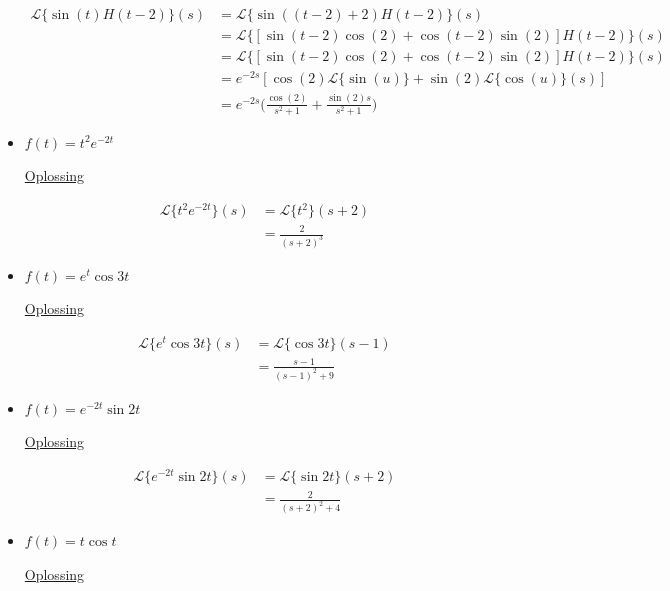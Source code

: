 \documentclass[12pt]{report}
\newcommand{\exercise}[2]{
#1


\underline{Oplossing}

#2

\hrulefill
}
\begin{document}
\begin{itemize}[label={}]
{{\begin{equation*}
\begin{split}
          \mathcal{L}\{\sin(t)H(t-2)\}(s) & = \mathcal{L}\{\sin((t - 2) + 2)H(t-2)\}(s) \\
                                          & = \mathcal{L}\{[\sin(t-2)\cos(2) + \cos(t-2)\sin(2)]H(t-2)\}(s) \\
                                          & = \mathcal{L}\{[\sin(t-2)\cos(2) + \cos(t-2)\sin(2)]H(t-2)\}(s) \\
                                          & = e^{-2s}[\cos(2)\mathcal{L}\{\sin(u)\} + \sin(2)\mathcal{L}\{\cos(u)\}(s)] \\
                                          & = e^{-2s}\bigg(\frac{\cos(2)}{s^2+1} + \frac{\sin(2)s}{s^2 + 1}\bigg)
         \end{split}
        \end{equation*}
    }
 }
 \item{
    \exercise{
        $f(t) = t^2e^{-2t}$
    }{
        \begin{equation*}
         \begin{split}
          \mathcal{L}\{t^2e^{-2t}\}(s) & = \mathcal{L}\{t^2\}(s + 2) \\
                                       & = \frac{2}{(s+2)^3}
         \end{split}
        \end{equation*}
    }
 }
 \item{
    \exercise{
        $f(t) = e^t\cos 3t$
    }{
        \begin{equation*}
         \begin{split}
          \mathcal{L}\{e^t\cos 3t\}(s) & = \mathcal{L}\{\cos 3t\}(s - 1) \\
                                       & = \frac{s - 1}{(s - 1)^2 + 9} 
         \end{split}
        \end{equation*}
    }
 }
 \item{
    \exercise{
        $f(t) = e^{-2t}\sin 2t$
    }{
        \begin{equation*}
         \begin{split}
          \mathcal{L}\{e^{-2t}\sin 2t\}(s) & = \mathcal{L}\{\sin 2t\}(s + 2) \\
                                       & = \frac{2}{(s + 2)^2 + 4}
         \end{split}
        \end{equation*}
    }
 }
 \item{
    \exercise{
        $f(t) = t\cos t$
    }{
        \begin{equation*}

\end{equation*}}}
\end{itemize}
\end{document}
